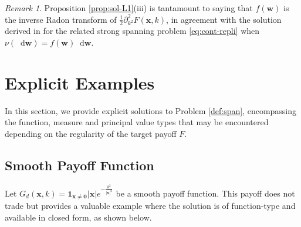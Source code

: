 \documentclass[11pt,A4,twoside]{article}
\newcommand\ind{\mathbf{1}}
\numberwithin{equation}{section}
\renewcommand{\b}[1]{{\color{blue}#1}}
\renewcommand{\vec}{\mathbf}
\newcommand{\F}{\mathcal{F}}
\newcommand{\Fi}{\mathcal{F}^{-1}}
\renewcommand*\d{\mathop{}\!\mathrm{d}}
\newcommand{\x}{\mathbf{x}}
\newcommand{\y}{\mathbf{y}}
\newcommand{\w}{\mathbf{w}}
\newcommand{\R}{\mathbbm{R}}
\newcommand{\intRd}{\int_{\R^d}}
\theoremstyle{definition}
\theoremstyle{remark}
\newtheorem{remark}{Remark}[section]
\def\R{\mathbb{R}}
\def\thef{\b{f}}\def\thef{f}
\def\thermi{{\rm i}}%
\begin{document}

\begin{remark} 
Proposition \ref{prop:sol-L1}(iii) is tantamount to saying that $f(\w)$ is the inverse Radon transform of $ \frac12\partial^2_{k^2} F(\x,k)$, in agreement with the solution derived in \citet[Section 3]{bossu2021static} for the related strong spanning problem \eqref{eq:cont-repli} when $\nu(\d\w)=f(\w)\d\w$.    
\end{remark}
 

\section{%
Explicit Examples}\label{ss:ex}

In this section, we provide explicit solutions to Problem \ref{def:span}, encompassing the function, measure and principal value types that may be encountered depending on the regularity of the target payoff $F$.

\subsection{Smooth Payoff Function\label{ss:mh}}
Let $G_d(\x,k) = \ind_{\x\ne\mathbf0} |\x| e^{-{\frac{k^2}{|\x|^2} }}$
be a smooth payoff function.  This payoff does not trade but provides a valuable example where the solution is of function-type and available in closed form, as shown below.
\end{document}
